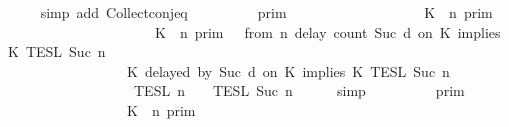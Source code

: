 \begin{isabellebody}
\ \ \ \ \isamarkupfalse%
\ {\isacharparenleft}simp\ add{\isacharcolon}\ Collect{\isacharunderscore}conj{\isacharunderscore}eq{\isacharparenright}\isanewline
\ \ \isamarkupfalse%
\ \isamarkupfalse%
\ {\isacartoucheopen}{\isachardot}{\isachardot}{\isachardot}\ {\isacharequal}\ {\isasymlbrakk}{\isasymlbrakk}\ {\isasymGamma}\ {\isasymrbrakk}{\isasymrbrakk}\isactrlsub p\isactrlsub r\isactrlsub i\isactrlsub m\ \isanewline
\ \ \ \ \ \ \ \ \ \ \ \ \ \ \ \ {\isasyminter}\ {\isacharparenleft}{\isasymlbrakk}\ K\ {\isasymnot}{\isasymUp}\ n\ {\isasymrbrakk}\isactrlsub p\isactrlsub r\isactrlsub i\isactrlsub m\ \isanewline
\ \ \ \ \ \ \ \ \ \ \ \ \ \ \ \ \ \ \ \ {\isasymunion}\ {\isacharparenleft}{\isasymlbrakk}\ K\ {\isasymUp}\ n\ {\isasymrbrakk}\isactrlsub p\isactrlsub r\isactrlsub i\isactrlsub m\ {\isasyminter}\ {\isasymlbrakk}\ from\ n\ delay\ count\ {\isacharparenleft}Suc\ d{\isacharparenright}\ on\ K\ implies\ K\ {\isasymrbrakk}\isactrlsub T\isactrlsub E\isactrlsub S\isactrlsub L\isactrlbsup {\isasymge}\ Suc\ n\isactrlesup {\isacharparenright}\isanewline
\ \ \ \ \ \ \ \ \ \ \ \ \ \ \ \ \ \ {\isacharparenright}\isanewline
\ \ \ \ \ \ \ \ \ \ \ \ \ \ \ \ {\isasyminter}\ {\isasymlbrakk}\ K\ delayed\ by\ {\isacharparenleft}Suc\ d{\isacharparenright}\ on\ K\ implies\ K\ {\isasymrbrakk}\isactrlsub T\isactrlsub E\isactrlsub S\isactrlsub L\isactrlbsup {\isasymge}\ Suc\ n\isactrlesup \isanewline
\ \ \ \ \ \ \ \ \ \ \ \ \ \ \ \ {\isasyminter}\ {\isasymlbrakk}{\isasymlbrakk}\ {\isasymPsi}\ {\isasymrbrakk}{\isasymrbrakk}\isactrlsub T\isactrlsub E\isactrlsub S\isactrlsub L\isactrlbsup {\isasymge}\ n\isactrlesup \ {\isasyminter}\ {\isasymlbrakk}{\isasymlbrakk}\ {\isasymPhi}\ {\isasymrbrakk}{\isasymrbrakk}\isactrlsub T\isactrlsub E\isactrlsub S\isactrlsub L\isactrlbsup {\isasymge}\ Suc\ n\isactrlesup {\isacartoucheclose}\isanewline
\ \ \ \ \isamarkupfalse%
\ simp\isanewline
\ \ \isamarkupfalse%
\ \isamarkupfalse%
\ {\isacartoucheopen}{\isachardot}{\isachardot}{\isachardot}\ {\isacharequal}\ {\isasymlbrakk}{\isasymlbrakk}\ {\isasymGamma}\ {\isasymrbrakk}{\isasymrbrakk}\isactrlsub p\isactrlsub r\isactrlsub i\isactrlsub m\ \isanewline
\ \ \ \ \ \ \ \ \ \ \ \ \ \ \ \ {\isasyminter}\ {\isacharparenleft}{\isasymlbrakk}\ K\ {\isasymnot}{\isasymUp}\ n\ {\isasymrbrakk}\isactrlsub p\isactrlsub r\isactrlsub i\isactrlsub m\isanewline

\end{isabellebody}
